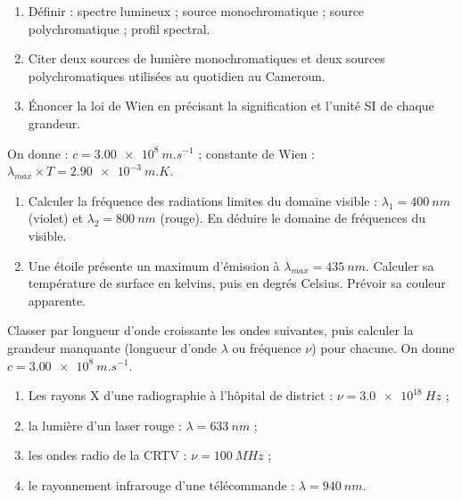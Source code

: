 \documentclass[11pt]{article}
\newcounter{popsec}
\newcounter{popsub}
\newcommand{\courssub}[1]{%
  \stepcounter{popsub}%
  \par\vspace{9pt}\noindent{\popxbold\fontsize{11.5}{13}\selectfont\color{popink}{\color{poporange}\thepopsec.\thepopsub}\hspace{6pt}#1}\par\nopagebreak\vspace{4pt}
}
\begin{document}
\begin{exercice}
\begin{enumerate}
\item Définir : spectre lumineux ; source monochromatique ; source polychromatique ; profil spectral.
\item Citer deux sources de lumière monochromatiques et deux sources polychromatiques utilisées au quotidien au Cameroun.
\item Énoncer la loi de Wien en précisant la signification et l'unité SI de chaque grandeur.
\end{enumerate}
\end{exercice}

\begin{exercice}
On donne : $c = \SI{3,00e8}{m.s^{-1}}$ ; constante de Wien : $\lambda_{max} \times T = \SI{2,90e-3}{m.K}$.
\begin{enumerate}
\item Calculer la fréquence des radiations limites du domaine visible : $\lambda_1 = \SI{400}{nm}$ (violet) et $\lambda_2 = \SI{800}{nm}$ (rouge). En déduire le domaine de fréquences du visible.
\item Une étoile présente un maximum d'émission à $\lambda_{max} = \SI{435}{nm}$. Calculer sa température de surface en kelvins, puis en degrés Celsius. Prévoir sa couleur apparente.
\end{enumerate}
\end{exercice}

\courssub{Je m'entraîne}

\begin{exercice}
Classer par longueur d'onde croissante les ondes suivantes, puis calculer la grandeur manquante (longueur d'onde $\lambda$ ou fréquence $\nu$) pour chacune. On donne $c = \SI{3,00e8}{m.s^{-1}}$.
\begin{enumerate}
\item Les rayons X d'une radiographie à l'hôpital de district : $\nu = \SI{3,0e18}{Hz}$ ;
\item la lumière d'un laser rouge : $\lambda = \SI{633}{nm}$ ;
\item les ondes radio de la CRTV : $\nu = \SI{100}{MHz}$ ;
\item le rayonnement infrarouge d'une télécommande : $\lambda = \SI{940}{nm}$.
\end{enumerate}
\end{exercice}
\end{document}
